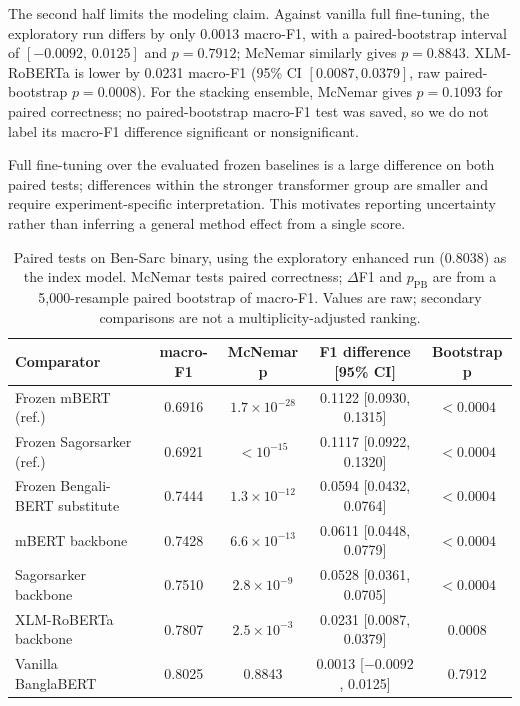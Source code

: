 \documentclass{ieeeaccess}
\newcommand{\dset}[1]{#1}
\begin{document}
The second half limits the modeling claim. Against vanilla full fine-tuning, the exploratory run differs by only 0.0013 macro-F1, with a paired-bootstrap interval of $[-0.0092,\,0.0125]$ and $p=0.7912$; McNemar similarly gives $p=0.8843$. XLM-RoBERTa is lower by 0.0231 macro-F1 (95\% CI $[0.0087,0.0379]$, raw paired-bootstrap $p=0.0008$). For the stacking ensemble, McNemar gives $p=0.1093$ for paired correctness; no paired-bootstrap macro-F1 test was saved, so we do not label its macro-F1 difference significant or nonsignificant.

Full fine-tuning over the evaluated frozen baselines is a large difference on both paired tests; differences within the stronger transformer group are smaller and require experiment-specific interpretation. This motivates reporting uncertainty rather than inferring a general method effect from a single score.

\begin{table}[!t]
\centering
\caption{Paired tests on \dset{Ben-Sarc} binary, using the exploratory enhanced run (0.8038) as the index model. McNemar tests paired correctness; $\Delta$F1 and $p_{\mathrm{PB}}$ are from a 5{,}000-resample paired bootstrap of macro-F1. Values are raw; secondary comparisons are not a multiplicity-adjusted ranking.}
\label{tab:bootstrap-mcnemar}
\small
\setlength{\tabcolsep}{3.5pt}
\begin{tabular}{@{}lcccc@{}}
\toprule
\textbf{Comparator} & \textbf{macro-F1} & \textbf{McNemar p} & \textbf{F1 difference [95\% CI]} & \textbf{Bootstrap p} \\
\midrule
Frozen mBERT (ref.) & 0.6916 & $1.7\!\times\!10^{-28}$ & 0.1122 [0.0930, 0.1315] & $<0.0004$ \\
Frozen Sagorsarker (ref.) & 0.6921 & $<10^{-15}$ & 0.1117 [0.0922, 0.1320] & $<0.0004$ \\
Frozen Bengali-BERT substitute & 0.7444 & $1.3\!\times\!10^{-12}$ & 0.0594 [0.0432, 0.0764] & $<0.0004$ \\
mBERT backbone & 0.7428 & $6.6\!\times\!10^{-13}$ & 0.0611 [0.0448, 0.0779] & $<0.0004$ \\
Sagorsarker backbone & 0.7510 & $2.8\!\times\!10^{-9}$ & 0.0528 [0.0361, 0.0705] & $<0.0004$ \\
XLM-RoBERTa backbone & 0.7807 & $2.5\!\times\!10^{-3}$ & 0.0231 [0.0087, 0.0379] & 0.0008 \\
Vanilla BanglaBERT & 0.8025 & 0.8843 & 0.0013 [$-0.0092$, 0.0125] & 0.7912 \\
\bottomrule
\end{tabular}
\end{table}
\end{document}
